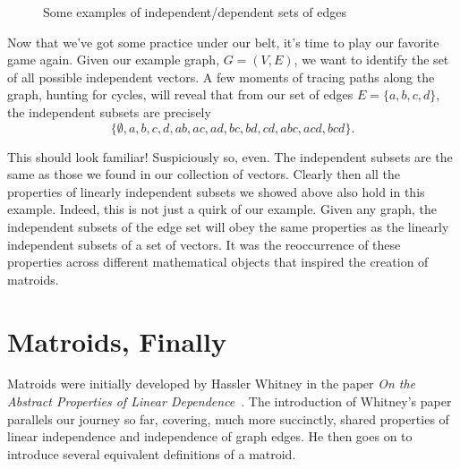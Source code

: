 \documentclass[12pt,oneside]{../../sfsuthesis}
\begin{document}
\begin{figure}[H]
\begin{subfigure}[t]{0.3\textwidth}

    \end{subfigure}
    \caption{Some examples of independent/dependent sets of edges}
\end{figure}

Now that we've got some practice under our belt, it's time to play our favorite game again.
Given our example graph, \( G = (V, E) \), we want to identify the set of all possible independent vectors.
A few moments of tracing paths along the graph, hunting for cycles, will reveal that from our set of edges \( E = \{ a, b, c, d \} \), the independent subsets are precisely
\[
    \{
    \emptyset,
    a, b, c, d,
    ab, ac, ad, bc, bd, cd,
    abc, acd, bcd
    \}.
\]

This should look familiar!
Suspiciously so, even.
The independent subsets are the same as those we found in our collection of vectors.
Clearly then all the properties of linearly independent subsets we showed above also hold in this example.
Indeed, this is not just a quirk of our example.
Given any graph, the independent subsets of the edge set will obey the same properties as the linearly independent subsets of a set of vectors.
It was the reoccurrence of these properties across different mathematical objects that inspired the creation of matroids.

\section{Matroids, Finally}

Matroids were initially developed by Hassler Whitney in the paper \textit{On the Abstract Properties of Linear Dependence}~\cite{whitneyAbstractPropertiesLinear1935}.
The introduction of Whitney's paper parallels our journey so far, covering, much more succinctly, shared properties of linear independence and independence of graph edges.
He then goes on  to introduce several equivalent definitions of a matroid.
\end{document}
